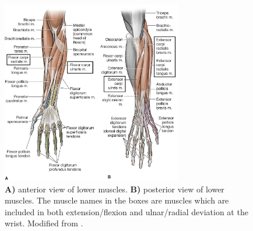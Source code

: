 \begin{figure}[H]
	\includegraphics[width=0.7\textwidth]{figures/anatomy/all_the_muscles}  %
	\caption{\textbf{A)} anterior view of lower muscles. \textbf{B)} posterior view of lower muscles. The muscle names in the boxes are muscles which are included in both extension/flexion and ulnar/radial deviation at the wrist. Modified from \cite{zezo2016}.}
	\label{fig:ALL_THE_MUSCLES}  %
\end{figure}


